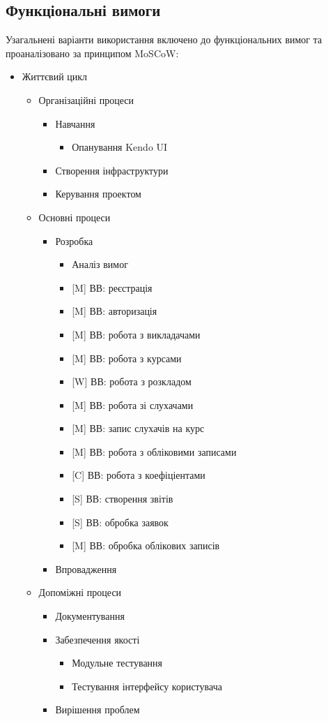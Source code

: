 \bigbreak
\subsection{Функціональні вимоги}
\bigbreak
Узагальнені варіанти використання включено до функціональних вимог та проаналізовано за принципом MoSCoW:
\begin{itemize}
 \item Життєвий цикл
 \begin{itemize}
  \item Організаційні процеси
  \begin{itemize}
   \item Навчання
   \begin{itemize}
    \item Опанування Kendo UI
   \end{itemize}
   \item Створення інфраструктури
   \item Керування проектом
  \end{itemize}
  \item Основні процеси
  \begin{itemize}
   \item Розробка
   \begin{itemize}
    \item Аналіз вимог
    \item {[}M{]} ВВ: реєстрація
    \item {[}M{]} ВВ: авторизація
    \item {[}M{]} ВВ: робота з викладачами
    \item {[}M{]} ВВ: робота з курсами
    \item {[}W{]} ВВ: робота з розкладом
    \item {[}M{]} ВВ: робота зі слухачами
    \item {[}M{]} ВВ: запис слухачів на курс
    \item {[}M{]} ВВ: робота з обліковими записами
    \item {[}C{]} ВВ: робота з коефіціентами
    \item {[}S{]} ВВ: створення звітів
    \item {[}S{]} ВВ: обробка заявок
    \item {[}M{]} ВВ: обробка облікових записів
   \end{itemize}
   \item Впровадження
  \end{itemize}
  \item Допоміжні процеси
  \begin{itemize}
   \item Документування
   \item Забезпечення якості
   \begin{itemize}
    \item Модульне тестування
    \item Тестування інтерфейсу користувача
   \end{itemize}
   \item Вирішення проблем
  \end{itemize}
 \end{itemize}
\end{itemize}
\bigbreak
